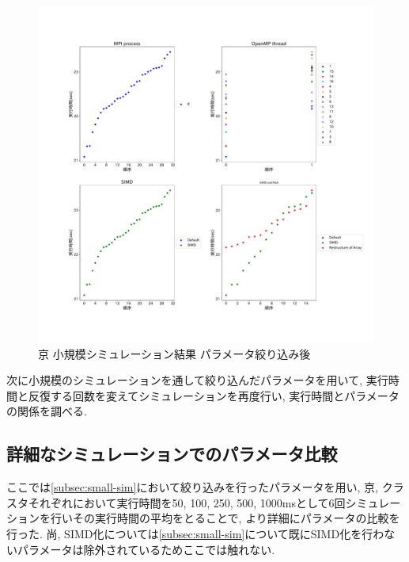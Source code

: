 \begin{figure}[htb]
\begin{center}
    \includegraphics[width=14cm]{./images/k-bench-adjusted-final.pdf}
    \caption{京 小規模シミュレーション結果 パラメータ絞り込み後}
    \label{fig:k-bench-adjusted-final}
\end{center}
\end{figure}
\clearpage
次に小規模のシミュレーションを通して絞り込んだパラメータを用いて,
実行時間と反復する回数を変えてシミュレーションを再度行い,
実行時間とパラメータの関係を調べる.\\

\subsection{詳細なシミュレーションでのパラメータ比較}
\label{subsec:detail-sim}
ここでは\ref{subsec:small-sim}において絞り込みを行ったパラメータを用い,
京, クラスタそれぞれにおいて実行時間を50, 100, 250, 500, 1000msとして6回シミュレーションを行いその実行時間の平均をとることで,
より詳細にパラメータの比較を行った.
尚, SIMD化については\ref{subsec:small-sim}について既にSIMD化を行わないパラメータは除外されているためここでは触れない.\\

